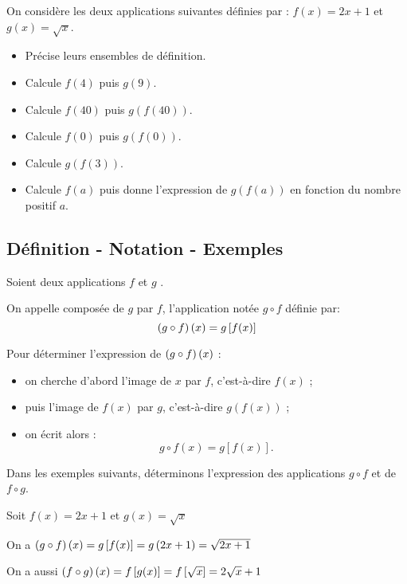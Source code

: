 


  
   \begin{lemma}
    On considère les deux applications suivantes définies par : $ f(x)=2x+1 $  et  $ g(x)=\sqrt{x} $.
  \begin{itemize}
\item  Précise leurs ensembles de définition.
 \item Calcule $ f(4) $  puis $ g(9) $.
 \item Calcule $ f(40) $  puis $ g(f(40)) $.
 \item Calcule $ f(0) $  puis $ g(f(0)) $.
 \item Calcule  $ g(f(3)) $.
 \item Calcule $ f(a) $  puis donne l'expression de $ g(f(a)) $  en fonction du  nombre positif $ a $.
 \end{itemize}
 \end{lemma}
\subsection*{Définition - Notation - Exemples}

  \begin{definition}
  Soient  deux applications  $f $ et $g$ .
 
 On appelle composée de $ g $  par $ f $, l'application notée $ g\circ f $ définie par:
  \[\left(g\circ f\right)(x)=g\left[ f(x) \right]\]
 \end{definition}
 
 \begin{methode}
 Pour déterminer l’expression de $\left(g \circ f\right)(x)$ :

\begin{itemize}
  \item on cherche d’abord l’image de $x$ par $f$, c’est-à-dire $f(x)$ ;
  \item puis l’image de $f(x)$ par $g$, c’est-à-dire $g(f(x))$ ;
  \item on écrit alors : \[ g \circ f(x) = g[f(x)]. \]
\end{itemize}

 \end{methode}
 Dans les exemples suivants, déterminons l'expression des applications  $ g\circ f $ et de $ f\circ g $.
  \begin{example}
  Soit $ f(x)= 2x+1 $  et $ g(x)=\sqrt{x} $

 
 On a $ \left(g\circ f\right)(x)=g\left[ f(x) \right]= g\left(2x+1\right)=\sqrt{2x+1} $
 


  On a aussi $ \left(f\circ g\right)(x)=f\left[ g(x) \right]= f\left[ \sqrt{x} \right]=2\sqrt{x}+1 $
  \end{example}

